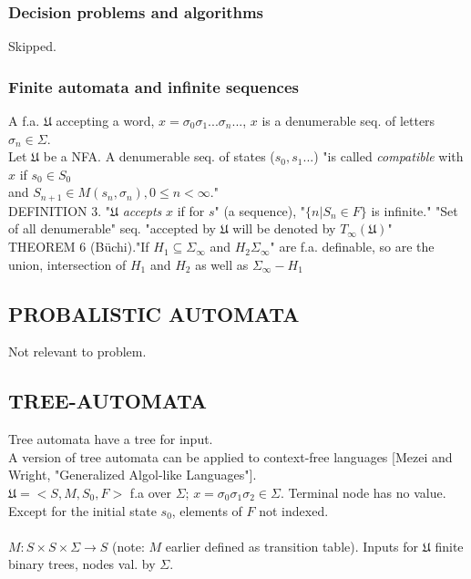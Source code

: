 \subsubsection{Decision problems and algorithms}
Skipped.

\subsubsection{Finite automata and infinite sequences}
A f.a. $\mathfrak{U}$ accepting a word, $x = \sigma_{0} \sigma_{1}...\sigma_{n}...$, $x$ is a denumerable seq. of letters $\sigma_n \in \Sigma$.\\
Let $\mathfrak{U}$ be a NFA. A denumerable seq. of states ($s_{0}, s_{1}...$) "is called \textit{compatible} with $x$ if $s_{0} \in S_{0}$\\ 
and $S_{n+1} \in M(s_{n}, \sigma_{n}),0 \le n < \infty$."\\

DEFINITION 3. "$\mathfrak{U}$ \textit{accepts} $x$ if for $s$" (a sequence), "$\{ n | S_n \in F \}$ is infinite."  "Set of all denumerable" seq. "accepted by $\mathfrak{U}$ will be denoted by $T_{\infty}(\mathfrak{U})$"\\

THEOREM 6 (B{\"u}chi)."If $H_1 \subseteq \Sigma_{\infty}$ and $H_2 \Sigma_{\infty}$" are f.a. definable, so are the union, intersection of $H_1$ and $H_2$ as well as $\Sigma_{\infty} - H_1$

\subsection{PROBALISTIC AUTOMATA}
Not relevant to problem.

\subsection{TREE-AUTOMATA}
Tree automata have a tree for input.\\
A version of tree automata can be applied to context-free languages [Mezei and Wright, "Generalized Algol-like Languages"].\\
$\mathfrak{U} = <S, M, S_0, F >$ f.a over $\Sigma$; $x = \sigma_{0}\sigma_{1}\sigma_{2} \in \Sigma$.  Terminal node has no value.  Except for the initial state $s_0$, elements of $F$ not indexed.\\
\\
$M: S \times S \times \Sigma \to S$ (note: $M$ earlier defined as transition table).  Inputs for $\mathfrak{U}$ finite binary trees, nodes val. by $\Sigma$.


